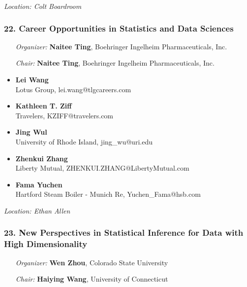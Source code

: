 \emph{Location: Colt Boardroom}

\subsubsection*{22. Career Opportunities in Statistics and Data Sciences}

\begin{enumerate}[align=left]
\item [\emph{Organizer:}] \textbf{Naitee Ting}, Boehringer Ingelheim Pharmaceuticals, Inc.
\item [\emph{Chair:}] \textbf{Naitee Ting}, Boehringer Ingelheim Pharmaceuticals, Inc.
\end{enumerate}

\begin{itemize}
\item \textbf{Lei Wang} \\
 Lotus Group, lei.wang@tlgcareers.com
\item \textbf{Kathleen T. Ziff} \\
 Travelers, KZIFF@travelers.com
\item \textbf{Jing Wul} \\
 University of Rhode Island, jing\_wu@uri.edu
\item \textbf{Zhenkui Zhang} \\
 Liberty Mutual, ZHENKUI.ZHANG@LibertyMutual.com
\item \textbf{Fama Yuchen} \\
 Hartford Steam Boiler - Munich Re, Yuchen\_Fama@hsb.com
\end{itemize}

\emph{Location: Ethan Allen}

\subsubsection*{23. New Perspectives in Statistical Inference for Data with High Dimensionality}

\begin{enumerate}[align=left]
\item [\emph{Organizer:}] \textbf{Wen Zhou}, Colorado State University
\item [\emph{Chair:}] \textbf{Haiying Wang},  University of Connecticut
\end{enumerate}

